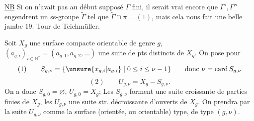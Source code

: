 \uline{NB} Si on n'avait pas au début supposé
$\Gamma$ fini, il serait vrai encore que $\Gamma',\Gamma''$
engendrent un ss-groupe $\widetilde\Gamma$  tel que
$\widetilde\Gamma\cap\pi=(1)$, mais cela nous fait une
belle jambe 
19. Tour de Teichmüller.

Soit  $X_g$ une surface compacte orientable de
genre $g$, 
\unsure{$[$|$]$} $(a_{g,i})_{i\in\mathbb N^*}=(a_{g,1},a_{g,2},\ldots)$ \unsure{$]$|$[$}
une suite de
pts distincts de $X_g$. On pose pour 
\[
(1)\qquad S_{g,\nu}=\{\unsure{x_{g,i}|a_{g,i}}\mid 0\leq i\leq\nu-1\}
\qquad\text{donc }\nu=\operatorname{card}S_{g,\nu}
\]
\[
(2)\qquad U_{g,\nu}=X_g-S_{g,\nu}.
\]
On a donc $S_{g,0}=\varnothing$, $U_{g,0}=X_g$; Les $S_{g,\nu}$ forment
une suite  croissante de parties finies de $X_g$,
les $U_{g,\nu}$ une suite str. décroissante d'ouverts
de $X_g$. On prendra par la suite $U_{g,\nu}$ comme
la surface (orientée, ou orientable) type, de
type $(g,\nu)$.

